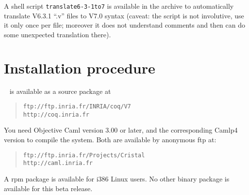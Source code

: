 \documentclass[11pt]{article}
\begin{document}
A shell script \verb=translate6-3-1to7= is available in the archive to
automatically translate V6.3.1 ``.v'' files to V7.0 syntax (caveat:
the script is not involutive, use it only once per file; moreover it
does not understand comments and then can do some unexpected
translation there).


\section{Installation procedure}


\Coq~ is available as a source package at 

\begin{quote}
\verb|ftp://ftp.inria.fr/INRIA/coq/V7|\\
\verb|http://coq.inria.fr|
\end{quote}

You need Objective Caml version 3.00 or later, and the corresponding 
Camlp4 version to compile the system. Both are available by anonymous ftp
at:

\begin{quote}
\verb|ftp://ftp.inria.fr/Projects/Cristal|\\
\verb|http://caml.inria.fr|
\end{quote}

\noindent
%

A rpm package is available for i386 Linux users. No other binary
package is available for this beta release.
\end{document}

